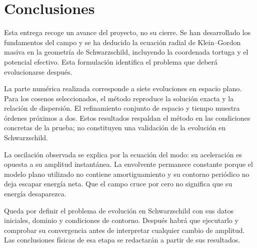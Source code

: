 \chapter{Conclusiones}
\label{ch:conclusiones}

Esta entrega recoge un avance del proyecto, no su cierre. Se han
desarrollado los fundamentos del campo y se ha deducido la ecuación
radial de Klein--Gordon masiva en la geometría de Schwarzschild,
incluyendo la coordenada tortuga y el potencial efectivo. Esta
formulación identifica el problema que deberá evolucionarse después.

La parte numérica realizada corresponde a siete evoluciones en espacio
plano. Para los cosenos seleccionados, el método reproduce la solución
exacta y la relación de dispersión. El refinamiento conjunto de espacio
y tiempo muestra órdenes próximos a dos. Estos resultados respaldan
el método en las condiciones concretas de la prueba; no constituyen
una validación de la evolución en Schwarzschild.

La oscilación observada se explica por la ecuación del modo:
su aceleración es opuesta a su amplitud instantánea. La envolvente
permanece constante porque el modelo plano utilizado no contiene
amortiguamiento y su contorno periódico no deja escapar energía neta.
Que el campo cruce por cero no significa que su energía desaparezca.

Queda por definir el problema de evolución en Schwarzschild con sus
datos iniciales, dominio y condiciones de contorno. Después habrá que
ejecutarlo y comprobar su convergencia antes de interpretar cualquier
cambio de amplitud. Las conclusiones físicas de esa etapa se
redactarán a partir de sus resultados.
